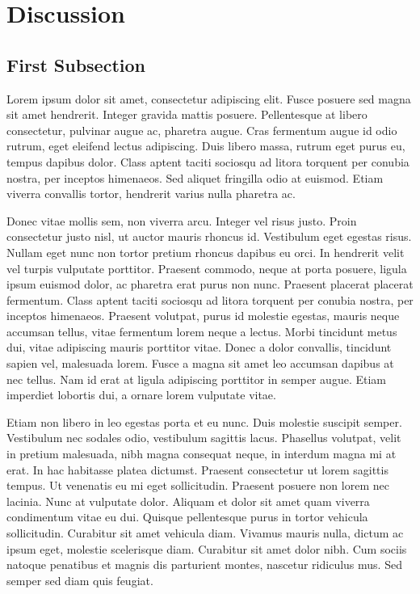 \documentclass[double,12pt]{beavtex}
\begin{document}

\chapter{Discussion}

\section{First Subsection}

Lorem ipsum dolor sit amet, consectetur adipiscing elit. Fusce posuere sed magna sit amet hendrerit. Integer gravida mattis posuere. Pellentesque at libero consectetur, pulvinar augue ac, pharetra augue. Cras fermentum augue id odio rutrum, eget eleifend lectus adipiscing. Duis libero massa, rutrum eget purus eu, tempus dapibus dolor. Class aptent taciti sociosqu ad litora torquent per conubia nostra, per inceptos himenaeos. Sed aliquet fringilla odio at euismod. Etiam viverra convallis tortor, hendrerit varius nulla pharetra ac. 

Donec vitae mollis sem, non viverra arcu. Integer vel risus justo. Proin consectetur justo nisl, ut auctor mauris rhoncus id. Vestibulum eget egestas risus. Nullam eget nunc non tortor pretium rhoncus dapibus eu orci. In hendrerit velit vel turpis vulputate porttitor. Praesent commodo, neque at porta posuere, ligula ipsum euismod dolor, ac pharetra erat purus non nunc. Praesent placerat placerat fermentum. Class aptent taciti sociosqu ad litora torquent per conubia nostra, per inceptos himenaeos. Praesent volutpat, purus id molestie egestas, mauris neque accumsan tellus, vitae fermentum lorem neque a lectus. Morbi tincidunt metus dui, vitae adipiscing mauris porttitor vitae. Donec a dolor convallis, tincidunt sapien vel, malesuada lorem. Fusce a magna sit amet leo accumsan dapibus at nec tellus. Nam id erat at ligula adipiscing porttitor in semper augue. Etiam imperdiet lobortis dui, a ornare lorem vulputate vitae. 

Etiam non libero in leo egestas porta et eu nunc. Duis molestie suscipit semper. Vestibulum nec sodales odio, vestibulum sagittis lacus. Phasellus volutpat, velit in pretium malesuada, nibh magna consequat neque, in interdum magna mi at erat. In hac habitasse platea dictumst. Praesent consectetur ut lorem sagittis tempus. Ut venenatis eu mi eget sollicitudin. Praesent posuere non lorem nec lacinia. Nunc at vulputate dolor. Aliquam et dolor sit amet quam viverra condimentum vitae eu dui. Quisque pellentesque purus in tortor vehicula sollicitudin. Curabitur sit amet vehicula diam. Vivamus mauris nulla, dictum ac ipsum eget, molestie scelerisque diam. Curabitur sit amet dolor nibh. Cum sociis natoque penatibus et magnis dis parturient montes, nascetur ridiculus mus. Sed semper sed diam quis feugiat. 
\end{document}
